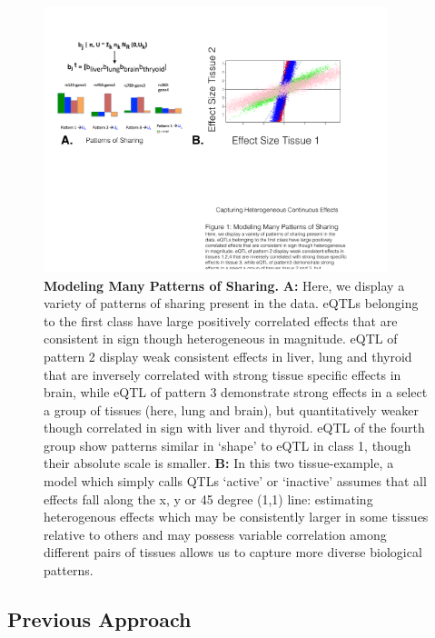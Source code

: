 
\newline
\begin{figure}[htbp]
\includegraphics[width=10cm]{Figures/Patterns.pdf}
\caption{\textbf{Modeling Many Patterns of Sharing.} \textbf{A:} Here, we display a variety of patterns of sharing present in the data. eQTLs belonging to the first class have large positively correlated effects that are consistent in sign though heterogeneous in magnitude. eQTL of pattern 2 display weak consistent effects in liver, lung and thyroid that are inversely correlated with strong tissue specific effects in brain, while eQTL of pattern 3 demonstrate strong effects in a select a group of tissues (here, lung and brain), but quantitatively weaker though correlated in sign with liver and thyroid. eQTL of the fourth group show patterns similar in `shape' to eQTL in class 1, though their absolute scale is smaller. \textbf{B:} In this two tissue-example, a model which simply calls QTLs `active' or `inactive' assumes that all effects fall along the x, y or 45 degree (1,1) line: estimating heterogenous effects which may be consistently larger in some tissues relative to others and may possess variable correlation among different pairs of tissues allows us to capture more diverse biological patterns.}
\label{fig:Patterns}
\end{figure}
\newline


\subsection{Previous Approach}
 
